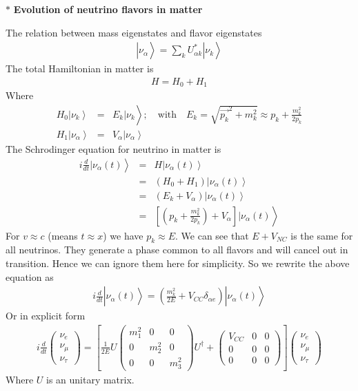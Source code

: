 \documentclass[a4 paper,12pt]{report}%
\begin{document}
$*$ \textbf{Evolution of neutrino flavors in matter}\par
The relation between mass eigenstates and flavor eigenstates
   \begin{eqnarray}\nonumber
|\nu_\alpha\left.\right> = \sum_kU^*_{\alpha k}|\nu_k\left. \right> 
   \end{eqnarray} 
 The total Hamiltonian in matter is
   \begin{eqnarray}\nonumber
H = H_0 + H_1
   \end{eqnarray} 
Where 
   \begin{eqnarray}\nonumber
H_0|\nu_k\left.\right> &=& E_k|\nu_k\left.\right>; \quad \text{with}\quad E_k = \sqrt{\vec{p_k}^2+m_k^2}\approx p_k + \frac{m^2_k}{2p_k}\\ \nonumber
H_1|\nu_\alpha\left.\right> &=& V_\alpha|\nu_\alpha\left.\right>
   \end{eqnarray} 
The Schrodinger equation for neutrino in matter is
   \begin{eqnarray}\nonumber
i\frac{d}{dt}|\nu_\alpha(t)\left.\right> &=& H|\nu_\alpha(t)\left.\right> \\ \nonumber
 &=& (H_0+ H_1)|\nu_\alpha(t)\left.\right> \\ \nonumber
 &=& (E_k + V_\alpha)|\nu_\alpha(t)\left.\right> \\ \nonumber
&=&  \left[\left(p_k + \frac{m^2_k}{2p_k}\right) + V_\alpha\right]|\nu_\alpha(t)\left.\right> 
   \end{eqnarray} 
For $v \approx c$ (means $t \approx x$) we have $p_k \approx E$. We can see that $E + V_{NC}$ is the same for all neutrinos. They generate a phase common to all flavors and will cancel out in transition. Hence we can ignore them here for simplicity. So we rewrite the above equation as
   \begin{eqnarray}\nonumber
i\frac{d}{dt}|\nu_\alpha(t)\left.\right> = \left( \frac{m^2_k}{2E}+V_{CC}\delta_{\alpha e}\right)|\nu_\alpha(t)\left.\right> 
   \end{eqnarray} 
Or in explicit form
\begin{eqnarray} \label{56}
i\frac{d}{dt}\left(\begin{array}{ccc}\nu_e\\ \nu_\mu\\ \nu_\tau\end{array}\right)= \left[\frac{1}{2E}U\left(\begin{array}{ccc}m^2_1&0&0\\0&m^2_2&0\\ 0&0& m^2_3\end{array}\right)U^{\dagger}+\left(\begin{array}{ccc}V_{CC}&0&0\\0&0&0\\ 0&0&0\end{array}\right)\right]\left(\begin{array}{ccc}\nu_e\\ \nu_\mu\\ \nu_\tau\end{array}\right)
\end{eqnarray}
Where $U$ is an unitary matrix.\par
\end{document}
